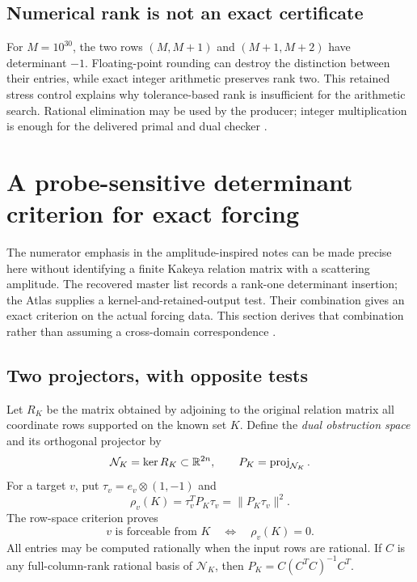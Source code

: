\documentclass[11pt,letterpaper]{article}
\theoremstyle{definition}
\theoremstyle{remark}\newtheorem{remark}[theorem]{Remark}
\begin{document}
\subsection{Numerical rank is not an exact certificate}
For $M=10^{30}$, the two rows $(M,M+1)$ and $(M+1,M+2)$ have determinant $-1$. Floating-point rounding can destroy the distinction between their entries, while exact integer arithmetic preserves rank two. This retained stress control explains why tolerance-based rank is insufficient for the arithmetic search. Rational elimination may be used by the producer; integer multiplication is enough for the delivered primal and dual checker \cite{BeasleyFrontier}.

\section{A probe-sensitive determinant criterion for exact forcing}\label{sec:probe}
The numerator emphasis in the amplitude-inspired notes can be made precise here without identifying a finite Kakeya relation matrix with a scattering amplitude. The recovered master list records a rank-one determinant insertion; the Atlas supplies a kernel-and-retained-output test. Their combination gives an exact criterion on the actual forcing data. This section derives that combination rather than assuming a cross-domain correspondence \cite{BeasleyMaster,BeasleyProbe,BeasleyMethod}.

\subsection{Two projectors, with opposite tests}
Let $R_K$ be the matrix obtained by adjoining to the original relation matrix all coordinate rows supported on the known set $K$. Define the \emph{dual obstruction space} and its orthogonal projector by
\[
\mathcal N_K=\ker R_K\subset\mathbb R^{2n},\qquad P_K=\operatorname{proj}_{\mathcal N_K}.
\]
For a target $v$, put $\tau_v=e_v\otimes(1,-1)$ and
\begin{equation}\label{eq:dualresidual}
\rho_v(K)=\tau_v^TP_K\tau_v=\|P_K\tau_v\|^2.
\end{equation}
The row-space criterion proves
\begin{equation}\label{eq:rhozero}
v\text{ is forceable from }K\quad\Longleftrightarrow\quad\rho_v(K)=0.
\end{equation}
All entries may be computed rationally when the input rows are rational. If $C$ is any full-column-rank rational basis of $\mathcal N_K$, then $P_K=C(C^TC)^{-1}C^T$.
\end{document}
